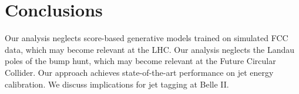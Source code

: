 \section{Conclusions}\label{sec:conclusions}

Our analysis neglects score-based generative models trained on simulated
FCC data, which may become relevant at the LHC. Our analysis neglects
the Landau poles of the bump hunt, which may become relevant at the
Future Circular Collider. Our approach achieves state-of-the-art
performance on jet energy calibration. We discuss implications for jet
tagging at Belle II.

